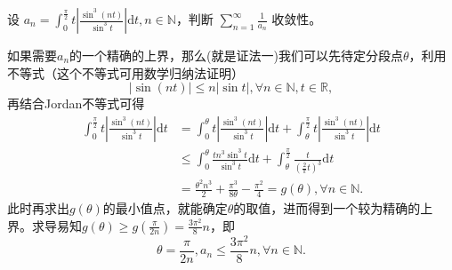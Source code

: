 \documentclass[../../main.tex]{subfiles}%
\begin{document}
\begin{example}
设 \( a_n = \int_{0}^{\frac{\pi}{2}} t \left| \frac{\sin^3 (nt)}{\sin^3 t} \right| \mathrm{d}t, n \in \mathbb{N} \)，判断 \( \sum_{n = 1}^{\infty} \frac{1}{a_n} \) 收敛性。
\end{example}
\begin{note}
如果需要$a_n$的一个精确的上界，那么(就是证法一)我们可以先待定分段点$\theta$，利用不等式（这个不等式可用数学归纳法证明）
\[
|\sin(nt)| \leqslant n|\sin t|, \forall n \in \mathbb{N}, t \in \mathbb{R},
\]
再结合Jordan不等式可得
\begin{align*}
\int_0^{\frac{\pi}{2}} t \left| \frac{\sin^3(nt)}{\sin^3 t} \right| \mathrm{d}t &= \int_0^{\theta} t \left| \frac{\sin^3(nt)}{\sin^3 t} \right| \mathrm{d}t + \int_{\theta}^{\frac{\pi}{2}} t \left| \frac{\sin^3(nt)}{\sin^3 t} \right| \mathrm{d}t \\
&\leqslant \int_0^{\theta} \frac{t n^3 \sin^3 t}{\sin^3 t} \mathrm{d}t + \int_{\theta}^{\frac{\pi}{2}} \frac{t}{\left( \frac{2}{\pi} t \right)^3} \mathrm{d}t \\
&= \frac{\theta^2 n^3}{2} + \frac{\pi^3}{8 \theta} - \frac{\pi^2}{4} = g(\theta), \forall n \in \mathbb{N}.
\end{align*}
此时再求出$g(\theta)$的最小值点，就能确定$\theta$的取值，进而得到一个较为精确的上界。求导易知$g(\theta) \geqslant g\left( \frac{\pi}{2n} \right) = \frac{3\pi^2}{8} n$，即
\[
\theta = \frac{\pi}{2n}, a_n \leqslant \frac{3\pi^2}{8} n, \forall n \in \mathbb{N}.
\]
\end{note}
\end{document}
